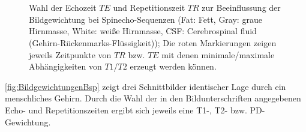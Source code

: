 \begin{figure}[H]
	\centering
	\\
	\\
	\caption[Bildgewichtung bei Spinecho-Sequenzen]{Wahl der Echozeit $TE$ und Repetitionszeit $TR$ zur Beeinflussung der Bildgewichtung bei Spinecho-Sequenzen (Fat: Fett, Gray: graue Hirnmasse, White: weiße Hirnmasse, CSF: Cerebrospinal fluid (Gehirn-Rückenmarks-Flüssigkeit)); Die roten Markierungen zeigen jeweils Zeitpunkte von $TR$ bzw. $TE$ mit denen minimale/maximale Abhängigkeiten von $T1$/$T2$ erzeugt werden können. \cite[S.~424ff]{Bushberg2011}}
	\label{fig:Bildgewichtungen}
\end{figure}

\autoref{fig:BildgewichtungenBsp} zeigt drei Schnittbilder identischer Lage durch ein menschliches Gehirn. Durch die Wahl der in den Bildunterschriften angegebenen Echo- und Repetitionszeiten ergibt sich jeweils eine T1-, T2- bzw. PD-Gewichtung. 

